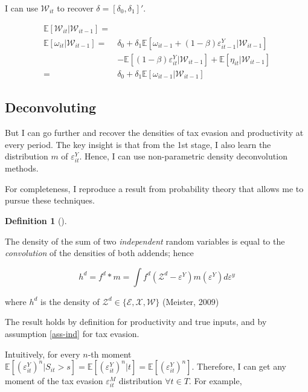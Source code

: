 \documentclass[
  12pt]{article}
\theoremstyle{definition}
\newtheorem{definition}{Definition}[section]
\theoremstyle{remark}
\begin{document}
I can use \(\mathcal W_{it}\) to recover
\(\delta=[\delta_0,\delta_1]'\).

\[
\begin{aligned}
  \mathbb{E}[\mathcal W_{it}|\mathcal W_{it-1}]=&\\
  \mathbb{E}[\omega_{it}|\mathcal W_{it-1}]=&\delta_0+\delta_1\mathbb{E}[\omega_{it-1}+(1-\beta)\varepsilon^Y_{it-1}|\mathcal W_{it-1}]\\
  &-\mathbb{E}[(1-\beta)\varepsilon^Y_{it}|\mathcal W_{it-1}]
  +\mathbb{E}[\eta_{it}|\mathcal W_{it-1}]\\
  =&\delta_0+\delta_1\mathbb{E}[\omega_{it-1}|\mathcal W_{it-1}]
\end{aligned}
\]

\hypertarget{deconvoluting}{%
\subsection{Deconvoluting}\label{deconvoluting}}

But I can go further and recover the densities of tax evasion and
productivity at every period. The key insight is that from the 1st
stage, I also learn the distribution \(m\) of \(\varepsilon^Y_{it}\).
Hence, I can use non-parametric density deconvolution methods.

For completeness, I reproduce a result from probability theory that
allows me to pursue these techniques.

\begin{definition}[]\protect\hypertarget{def-deconv}{}\label{def-deconv}

The density of the sum of two \emph{independent} random variables is
equal to the \emph{convolution} of the densities of both addends; hence

\[h^d = f^d*m = \int f^d(\mathcal Z^d - \varepsilon^Y)m(\varepsilon^Y)d\varepsilon^y\]

where \(h^d\) is the density of \(\mathcal Z^d\in \{\mathcal{E,X,W}\}\)
(Meister, 2009)

\end{definition}

The result holds by definition for productivity and true inputs, and by
assumption \ref{ass-ind} for tax evasion.

Intuitively, for every \(n\)-th moment
\(\mathbb{E}[(\varepsilon^{Y}_{it})^n|S_{it}>s]=\mathbb{E}[(\varepsilon^{Y}_{it})^n|t]=\mathbb{E}[(\varepsilon^{Y}_{it})^n]\).
Therefore, I can get any moment of the tax evasion
\(\varepsilon^M_{it}\) distribution \(\forall t\in T\). For example,
\end{document}

